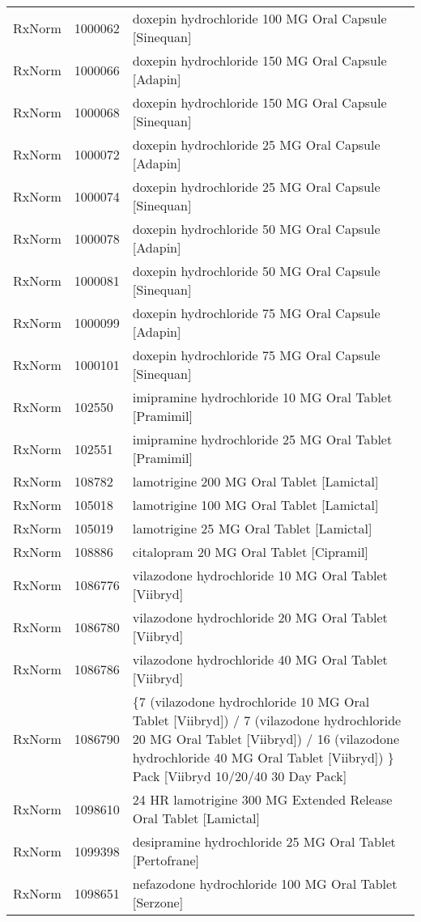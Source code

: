 \begin{longtable}{p{}p{}p{}}
  RxNorm & 1000062 & doxepin hydrochloride 100 MG Oral Capsule [Sinequan] \\ 
  RxNorm & 1000066 & doxepin hydrochloride 150 MG Oral Capsule [Adapin] \\ 
  RxNorm & 1000068 & doxepin hydrochloride 150 MG Oral Capsule [Sinequan] \\ 
  RxNorm & 1000072 & doxepin hydrochloride 25 MG Oral Capsule [Adapin] \\ 
  RxNorm & 1000074 & doxepin hydrochloride 25 MG Oral Capsule [Sinequan] \\ 
  RxNorm & 1000078 & doxepin hydrochloride 50 MG Oral Capsule [Adapin] \\ 
  RxNorm & 1000081 & doxepin hydrochloride 50 MG Oral Capsule [Sinequan] \\ 
  RxNorm & 1000099 & doxepin hydrochloride 75 MG Oral Capsule [Adapin] \\ 
  RxNorm & 1000101 & doxepin hydrochloride 75 MG Oral Capsule [Sinequan] \\ 
  RxNorm & 102550 & imipramine hydrochloride 10 MG Oral Tablet [Pramimil] \\ 
  RxNorm & 102551 & imipramine hydrochloride 25 MG Oral Tablet [Pramimil] \\ 
  RxNorm & 108782 & lamotrigine 200 MG Oral Tablet [Lamictal] \\ 
  RxNorm & 105018 & lamotrigine 100 MG Oral Tablet [Lamictal] \\ 
  RxNorm & 105019 & lamotrigine 25 MG Oral Tablet [Lamictal] \\ 
  RxNorm & 108886 & citalopram 20 MG Oral Tablet [Cipramil] \\ 
  RxNorm & 1086776 & vilazodone hydrochloride 10 MG Oral Tablet [Viibryd] \\ 
  RxNorm & 1086780 & vilazodone hydrochloride 20 MG Oral Tablet [Viibryd] \\ 
  RxNorm & 1086786 & vilazodone hydrochloride 40 MG Oral Tablet [Viibryd] \\ 
  RxNorm & 1086790 & \{7 (vilazodone hydrochloride 10 MG Oral Tablet [Viibryd]) / 7 (vilazodone hydrochloride 20 MG Oral Tablet [Viibryd]) / 16 (vilazodone hydrochloride 40 MG Oral Tablet [Viibryd]) \} Pack [Viibryd 10/20/40 30 Day Pack] \\ 
  RxNorm & 1098610 & 24 HR lamotrigine 300 MG Extended Release Oral Tablet [Lamictal] \\ 
  RxNorm & 1099398 & desipramine hydrochloride 25 MG Oral Tablet [Pertofrane] \\ 
  RxNorm & 1098651 & nefazodone hydrochloride 100 MG Oral Tablet [Serzone] \\ 

\end{longtable}
